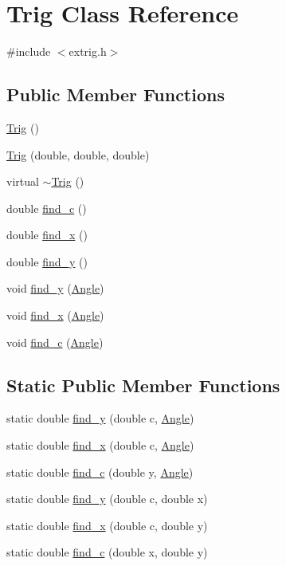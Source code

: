 \hypertarget{class_trig}{}\section{Trig Class Reference}
\label{class_trig}


{\ttfamily \#include $<$extrig.\+h$>$}

\subsection*{Public Member Functions}
\begin{DoxyCompactItemize}
\item 
\hyperlink{class_trig_af37d4a72cdcd86cb5b0c80fb938178c1}{Trig} ()
\item 
\hyperlink{class_trig_a6405daa6af6338cda28c3ac0209a66b5}{Trig} (double, double, double)
\item 
virtual \hyperlink{class_trig_a7c6a54cd20abd479223bf852dde7c800}{$\sim$\+Trig} ()
\item 
double \hyperlink{class_trig_a0df335b681e7d687bffd846ea92da12a}{find\+\_\+c} ()
\item 
double \hyperlink{class_trig_a1e30621c0ea74e667c326354d38c52c3}{find\+\_\+x} ()
\item 
double \hyperlink{class_trig_a5175d2d7aa5c6e7f71b07ed9a2b20ddf}{find\+\_\+y} ()
\item 
void \hyperlink{class_trig_a92bed6cfcf525f3af77266628c872ca9}{find\+\_\+y} (\hyperlink{class_angle}{Angle})
\item 
void \hyperlink{class_trig_a7ab6b681d3c1f86a19385d794fe54ede}{find\+\_\+x} (\hyperlink{class_angle}{Angle})
\item 
void \hyperlink{class_trig_aaf348730d3e08e7d2b80bc4ce7d58c88}{find\+\_\+c} (\hyperlink{class_angle}{Angle})
\end{DoxyCompactItemize}
\subsection*{Static Public Member Functions}
\begin{DoxyCompactItemize}
\item 
static double \hyperlink{class_trig_ab9e0277974b14b5dd00f9d070d23a658}{find\+\_\+y} (double c, \hyperlink{class_angle}{Angle})
\item 
static double \hyperlink{class_trig_af1b7cbc5beea5b7fcc86f33b3a16ecbc}{find\+\_\+x} (double c, \hyperlink{class_angle}{Angle})
\item 
static double \hyperlink{class_trig_ae84f377eba98d4a70f635ce63920316e}{find\+\_\+c} (double y, \hyperlink{class_angle}{Angle})
\item 
static double \hyperlink{class_trig_a84e6654d0f90ff9ffff1c08c8cce6cdc}{find\+\_\+y} (double c, double x)
\item 
static double \hyperlink{class_trig_a05a90b8da4e7e21cba181174278f5442}{find\+\_\+x} (double c, double y)
\item 
static double \hyperlink{class_trig_aebf87cc61a101d691e33e40455abbbcc}{find\+\_\+c} (double x, double y)
\end{DoxyCompactItemize}
